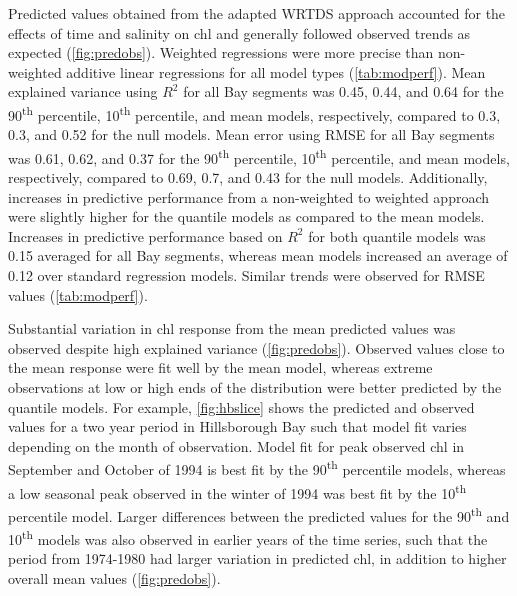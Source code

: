 \documentclass[letterpaper,12pt,oneside]{article}\usepackage{graphicx, color}
\newcommand{\nine}{90\textsuperscript{th} percentile }
\newcommand{\ten}{10\textsuperscript{th} percentile }
\begin{document}
Predicted values obtained from the adapted \ac{WRTDS} approach accounted for the effects of time and salinity on \ac{chl} and generally followed observed trends as expected (\cref{fig:predobs}).  Weighted regressions were more precise than non-weighted additive linear regressions for all model types (\cref{tab:modperf}).   Mean explained variance using $R^2$ for all Bay segments was 0.45, 0.44, and 0.64 for the 90\textsuperscript{th} percentile, 10\textsuperscript{th} percentile, and mean models, respectively, compared to 0.3, 0.3, and 0.52 for the null models.  Mean error using \ac{RMSE} for all Bay segments was 0.61, 0.62, and 0.37 for the 90\textsuperscript{th} percentile, 10\textsuperscript{th} percentile, and mean models, respectively, compared to 0.69, 0.7, and 0.43 for the null models.  Additionally, increases in predictive performance from a non-weighted to weighted approach were slightly higher for the quantile models as compared to the mean models.  Increases in predictive performance based on $R^2$ for both quantile models was 0.15 averaged for all Bay segments, whereas mean models increased an average of 0.12 over standard regression models. Similar trends were observed for \ac{RMSE} values (\cref{tab:modperf}).    

Substantial variation in \ac{chl} response from the mean predicted values was observed despite high explained variance (\cref{fig:predobs}).  Observed values close to the mean response were fit well by the mean model, whereas extreme observations at low or high ends of the distribution were better predicted by the quantile models. For example, \cref{fig:hbslice} shows the predicted and observed values for a two year period in Hillsborough Bay such that model fit varies depending on the month of observation.  Model fit for peak observed \ac{chl} in September and October of 1994 is best fit by the \nine models, whereas a low seasonal peak observed in the winter of 1994 was best fit by the \ten model.  Larger differences between the predicted values for the 90\textsuperscript{th} and 10\textsuperscript{th} models was also observed in earlier years of the time series, such that the period from 1974-1980 had larger variation in predicted \ac{chl}, in addition to higher overall mean values (\cref{fig:predobs}).  
\end{document}
